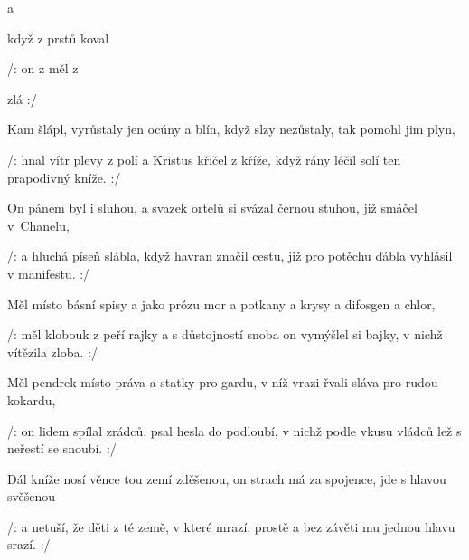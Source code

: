 

\zs
{}   a 

když z prstů koval  

/: on z   měl  z   

  zlá   :/
\ks

\zs
Kam šlápl, vyrůstaly jen ocúny a blín, když slzy nezůstaly, tak pomohl jim plyn,

/: hnal vítr plevy z polí a Kristus křičel z kříže, když rány léčil solí ten prapodivný kníže. :/
\ks

\zs
On pánem byl i sluhou, a svazek ortelů si svázal černou stuhou, již smáčel v~Chanelu,

/: a hluchá píseň slábla, když havran značil cestu, již pro potěchu ďábla vyhlásil v manifestu. :/
\ks

\zs
Měl místo básní spisy a jako prózu mor a potkany a krysy a difosgen a chlor,

/: měl klobouk z peří rajky a s důstojností snoba on vymýšlel si bajky, v nichž vítězila zloba. :/
\ks

\zs
Měl pendrek místo práva a statky pro gardu, v níž vrazi řvali sláva pro rudou kokardu,

/: on lidem spílal zrádců, psal hesla do podloubí, v nichž podle vkusu vládců lež s neřestí se snoubí. :/
\ks

\zs
Dál kníže nosí věnce tou zemí zděšenou, on strach má za spojence, jde s hlavou svěšenou

/: a netuší, že děti z té země, v které mrazí, prostě a bez závěti mu jednou hlavu srazí. :/
\ks

\kp
